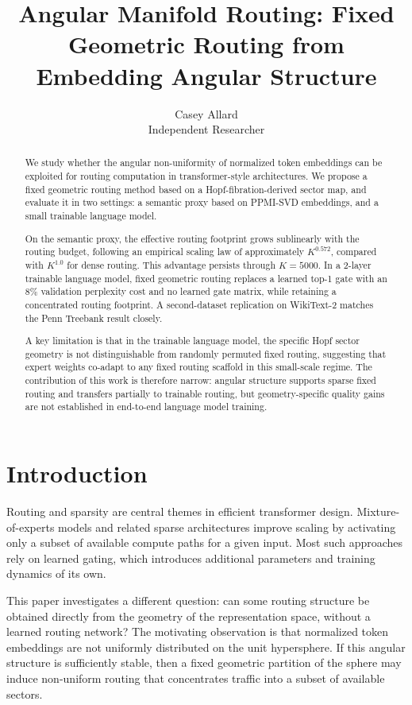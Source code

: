 \documentclass[10pt,twocolumn]{article}
\title{Angular Manifold Routing: Fixed Geometric Routing from Embedding Angular Structure}
\author{Casey Allard\\Independent Researcher}
\date{}
\begin{document}
\maketitle
\begin{abstract}
We study whether the angular non-uniformity of normalized token embeddings can be exploited for routing computation in transformer-style architectures. We propose a fixed geometric routing method based on a Hopf-fibration-derived sector map, and evaluate it in two settings: a semantic proxy based on PPMI-SVD embeddings, and a small trainable language model.

On the semantic proxy, the effective routing footprint grows sublinearly with the routing budget, following an empirical scaling law of approximately $K^{0.572}$, compared with $K^{1.0}$ for dense routing. This advantage persists through $K=5000$. In a 2-layer trainable language model, fixed geometric routing replaces a learned top-1 gate with an 8\% validation perplexity cost and no learned gate matrix, while retaining a concentrated routing footprint. A second-dataset replication on WikiText-2 matches the Penn Treebank result closely.

A key limitation is that in the trainable language model, the specific Hopf sector geometry is not distinguishable from randomly permuted fixed routing, suggesting that expert weights co-adapt to any fixed routing scaffold in this small-scale regime. The contribution of this work is therefore narrow: angular structure supports sparse fixed routing and transfers partially to trainable routing, but geometry-specific quality gains are not established in end-to-end language model training.
\end{abstract}

\section{Introduction}
Routing and sparsity are central themes in efficient transformer design. Mixture-of-experts models and related sparse architectures improve scaling by activating only a subset of available compute paths for a given input. Most such approaches rely on learned gating, which introduces additional parameters and training dynamics of its own.

This paper investigates a different question: can some routing structure be obtained directly from the geometry of the representation space, without a learned routing network? The motivating observation is that normalized token embeddings are not uniformly distributed on the unit hypersphere. If this angular structure is sufficiently stable, then a fixed geometric partition of the sphere may induce non-uniform routing that concentrates traffic into a subset of available sectors.
\end{document}
